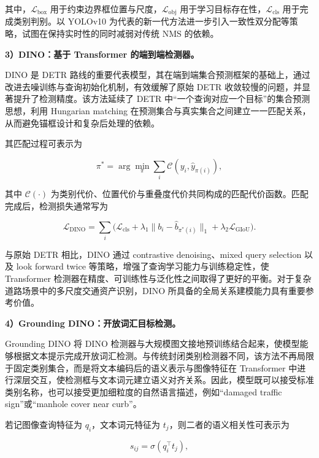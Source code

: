 其中，$\mathcal{L}_{\text{box}}$ 用于约束边界框位置与尺度，$\mathcal{L}_{\text{obj}}$ 用于学习目标存在性，$\mathcal{L}_{\text{cls}}$ 用于完成类别判别。以 YOLOv10 为代表的新一代方法进一步引入一致性双分配等策略，试图在保持实时性的同时减弱对传统 NMS 的依赖\cite{yolov10}。

\noindent\textbf{3）DINO：基于 Transformer 的端到端检测器。}

DINO 是 DETR 路线的重要代表模型，其在端到端集合预测框架的基础上，通过改进去噪训练与查询初始化机制，有效缓解了原始 DETR 收敛较慢的问题，并显著提升了检测精度\cite{zhang2022dino}。该方法延续了 DETR 中“一个查询对应一个目标”的集合预测思想，利用 Hungarian matching 在预测集合与真实集合之间建立一一匹配关系，从而避免锚框设计和复杂后处理的依赖。

其匹配过程可表示为

\begin{equation}
\pi^{*}=\arg\min_{\pi}\sum_{i}\mathcal{C}(y_i,\hat y_{\pi(i)}),
\end{equation}

其中 $\mathcal{C}(\cdot)$ 为类别代价、位置代价与重叠度代价共同构成的匹配代价函数。匹配完成后，检测损失通常写为

\begin{equation}
\mathcal{L}_{\text{DINO}}=\sum_{i}\Big(\mathcal{L}_{\text{cls}}+\lambda_{1}\|b_i-\hat b_{\pi^{*}(i)}\|_{1}+\lambda_{2}\mathcal{L}_{\text{GIoU}}\Big).
\end{equation}

与原始 DETR 相比，DINO 通过 contrastive denoising、mixed query selection 以及 look forward twice 等策略，增强了查询学习能力与训练稳定性，使 Transformer 检测器在精度、可训练性与泛化性之间取得了更好的平衡。对于复杂道路场景中的多尺度交通资产识别，DINO 所具备的全局关系建模能力具有重要参考价值。

\noindent\textbf{4）Grounding DINO：开放词汇目标检测。}

Grounding DINO 将 DINO 检测器与大规模图文接地预训练结合起来，使模型能够根据文本提示完成开放词汇检测\cite{liu2024grounding}。与传统封闭类别检测器不同，该方法不再局限于固定类别集合，而是将文本编码后的语义表示与图像特征在 Transformer 中进行深层交互，使检测框与文本词元建立语义对齐关系。因此，模型既可以接受标准类别名称，也可以接受更加细粒度的自然语言描述，例如“damaged traffic sign”或“manhole cover near curb”。

若记图像查询特征为 $q_i$，文本词元特征为 $t_j$，则二者的语义相关性可表示为

\begin{equation}
s_{ij}=\sigma(q_i^{\top}t_j),
\end{equation}

